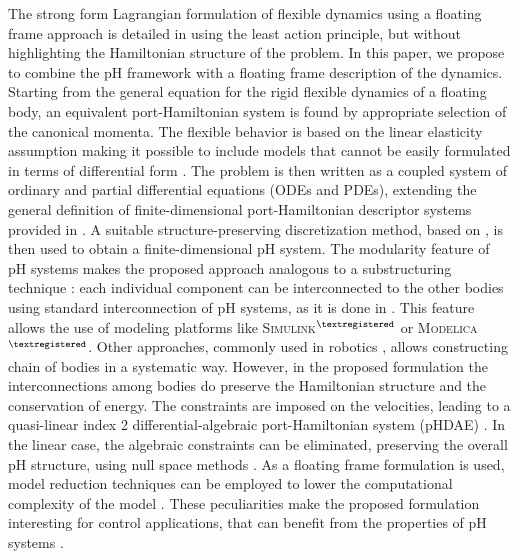 \documentclass{svjour3}                     %
\newcommand{\firstRev}[1]{\textcolor{red!80!black}{#1}}
\begin{document}
\indent \firstRev{The strong form Lagrangian formulation of flexible dynamics using a floating frame approach is detailed in  \cite[Eq. 4.10]{simeon2013computational} using the least action principle, but without highlighting the Hamiltonian structure of the problem.} In this paper, we propose to combine the pH framework with a floating frame description of the dynamics. Starting from the general equation for the rigid flexible dynamics of a floating body, an equivalent port-Hamiltonian system is found by appropriate selection of the canonical momenta. The flexible behavior is based on the linear elasticity assumption making it possible to include models that cannot be easily formulated in terms of differential form  \cite{BRUGNOLI2019940,BRUGNOLI2019961}. The problem is then written as a coupled system of ordinary and partial differential equations (ODEs and PDEs), extending the general definition of finite-dimensional port-Hamiltonian descriptor systems provided in \cite{mehrmann2019structurepreserving}. A suitable structure-preserving discretization method, based on \cite{cardoso2019partitioned}, is then used to obtain a finite-dimensional pH system. The modularity feature of pH systems makes the proposed approach analogous to a substructuring technique \cite{substructuring}: each individual component can be interconnected to the other bodies using standard interconnection of pH systems, as it is done in \cite{macchelli_flrig}. This feature allows the use of modeling platforms like \textsc{Simulink}$^{\tiny{\textregistered}}$ or \textsc{Modelica}$^{\tiny{\textregistered}}$. \firstRev{Other approaches, commonly used in robotics \cite[Chapter 5]{bremer2008elastic}, allows constructing chain of bodies in a systematic way. However, in the proposed formulation the interconnections among bodies do preserve the Hamiltonian structure and the conservation of energy.} The constraints are imposed on the velocities, leading to a quasi-linear index 2 differential-algebraic port-Hamiltonian system (pHDAE) \cite{phd_steinbrecher,beattie2018linear}. In the linear case, the algebraic constraints can be eliminated, preserving the overall pH structure, using null space methods \cite{nullspaceFlMult}.  As a floating frame formulation is used, model reduction techniques can be employed to lower the computational complexity of the model \cite{phode_red,phdae_red}. These peculiarities make the proposed formulation interesting for control applications, that can benefit from the properties of pH systems \cite{PHadaptive,ORTEGAsurvey}.  \\
\end{document}
